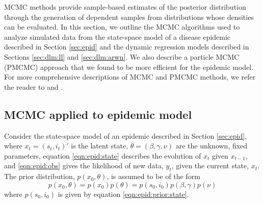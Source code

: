 MCMC methods provide sample-based estimates of the posterior distribution through the generation of dependent samples from distributions whose densities can be evaluated. In this section, we outline the MCMC algorithms used to analyze simulated data from the state-space model of a disease epidemic described in Section \ref{sec:epid} and the dynamic regression models described in Sections \ref{sec:dlm:ll} and \ref{sec:dlm:arwn}. We also describe a particle MCMC (PMCMC) approach that we found to be more efficient for the epidemic model. For more comprehensive descriptions of MCMC and PMCMC methods, we refer the reader to \citet{Robe:Case:mont:2004} and \citet{Andr:Douc:Hol:pmcmc:2010}.

\subsection{MCMC applied to epidemic model \label{sec:mcmc:epid}}

Consider the state-space model of an epidemic described in Section \ref{sec:epid}, where $x_t = (s_t,i_t)'$ is the latent state, $\theta = (\beta,\gamma,\nu)$ are the unknown, fixed parameters, equation \eqref{eqn:epid:state} describes the evolution of $x_t$ given $x_{t-1}$, and \eqref{eqn:epid:obs} gives the likelihood of new data, $y_t$, given the current state, $x_t$. The prior distribution, $p(x_0,\theta)$, is assumed to be of the form
\begin{equation}
p(x_0,\theta) = p(x_0)p(\theta) = p(s_0,i_0)p(\beta,\gamma)p(\nu) \label{eqn:epid:prior}
\end{equation}
where $p(s_0,i_0)$ is given by equation \eqref{eqn:epid:prior:state}.

